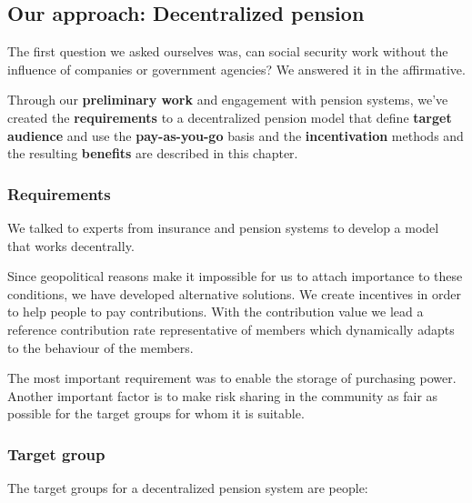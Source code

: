 \subsection{Our approach: Decentralized pension}

The first question we asked ourselves was, can social security work without the influence of companies or government agencies? We answered it in the affirmative.

Through our \textbf{preliminary work} and engagement with pension systems, we've created the \textbf{requirements} to a decentralized pension model that define \textbf{target audience} and use the \textbf{pay-as-you-go} basis and the \textbf{ incentivation} methods and the resulting \textbf{benefits} are described in this chapter.

\subsubsection{Requirements}
We talked to experts from insurance and pension systems to develop a model that works decentrally.

Since geopolitical reasons make it impossible for us to attach importance to these conditions, we have developed alternative solutions.
We create incentives in order to help people to pay contributions. With the contribution value we lead a reference contribution rate representative of members which dynamically adapts to the behaviour of the members.

The most important requirement was to enable the storage of purchasing power. Another important factor is to make risk sharing in the community as fair as possible for the target groups for whom it is suitable.

\subsubsection{Target group}
The target groups for a decentralized pension system are people:

